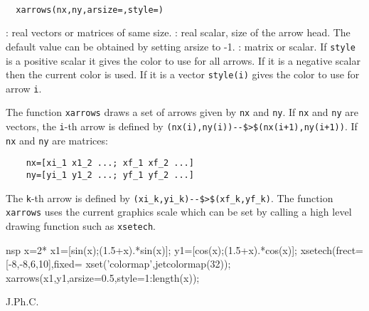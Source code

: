 
\begin{mandesc}
  \\ %
\end{mandesc}
\begin{calling_sequence}
\begin{verbatim}
  xarrows(nx,ny,arsize=,style=)  
\end{verbatim}
\end{calling_sequence}
\begin{parameters}
  \begin{varlist}
    : real vectors or matrices of same size.
    : real scalar, size of the arrow head. The default value can be obtained  by setting arsize to -1.
    : matrix or scalar. If \verb!style! is a positive scalar it
    gives the color to use for all arrows. If it is a negative scalar then the
    current color is used. If it is a vector \verb!style(i)! gives the color to
    use for arrow \verb!i!.
  \end{varlist}
\end{parameters}

\begin{mandescription}
  The function \verb!xarrows! draws a set of arrows given by \verb!nx! and \verb!ny!.
  If \verb!nx! and \verb!ny! are vectors, the \verb!i!-th arrow is defined by
  \verb!(nx(i),ny(i))--$>$(nx(i+1),ny(i+1))!.
  If \verb!nx! and \verb!ny! are matrices:
  \begin{Verbatim}
    nx=[xi_1 x1_2 ...; xf_1 xf_2 ...]
    ny=[yi_1 y1_2 ...; yf_1 yf_2 ...]
  \end{Verbatim}

  The \verb!k!-th arrow is defined by \verb!(xi_k,yi_k)--$>$(xf_k,yf_k)!. 
  The function \verb!xarrows! uses the current graphics scale 
  which can be set by calling a high level drawing function such as \verb!xsetech!.
\end{mandescription}
\begin{examples}
  \begin{mintednsp}{nsp}
    x=2*%
    x1=[sin(x);(1.5+x).*sin(x)];
    y1=[cos(x);(1.5+x).*cos(x)];
    xsetech(frect=[-8,-8,6,10],fixed=%
    xset('colormap',jetcolormap(32));
    xarrows(x1,y1,arsize=0.5,style=1:length(x));
  \end{mintednsp}
\end{examples}
\begin{authors}
  J.Ph.C.  
\end{authors}

